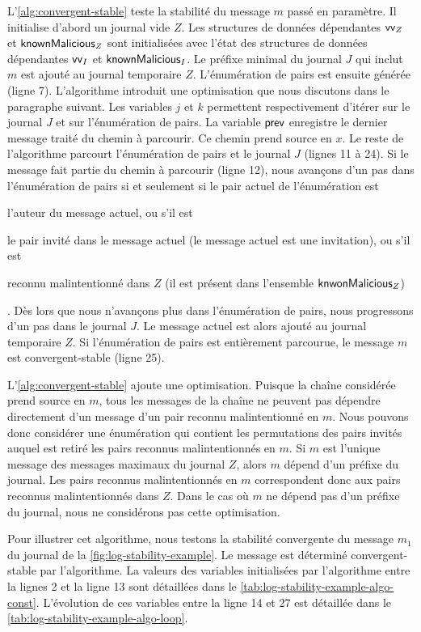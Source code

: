 L'\autoref{alg:convergent-stable} teste la stabilité du message $m$ passé en paramètre.
Il initialise d'abord un journal vide $Z$.
Les structures de données dépendantes $\operatorname{\mathsf{vv}}_Z$ et $\operatorname{\mathsf{knownMalicious}}_Z$ sont initialisées avec l'état des structures de données dépendantes $\operatorname{\mathsf{vv}}_I$ et $\operatorname{\mathsf{knownMalicious}}_I$.
Le préfixe minimal du journal $J$ qui inclut $m$ est ajouté au journal temporaire $Z$.
L'énumération de pairs est ensuite générée (ligne 7).
L'algorithme introduit une optimisation que nous discutons dans le paragraphe suivant.
Les variables $j$ et $k$ permettent respectivement d'itérer sur le journal $J$ et sur l'énumération de pairs.
La variable $\operatorname{\mathsf{prev}}$ enregistre le dernier message traité du chemin à parcourir.
Ce chemin prend source en $x$.
Le reste de l'algorithme parcourt l'énumération de pairs et le journal $J$ (lignes 11 à 24).
Si le message fait partie du chemin à parcourir (ligne 12), nous avançons d'un pas dans l'énumération de pairs si et seulement si le pair actuel de l'énumération est \begin{inlinelist}\item l'auteur du message actuel, ou s'il est \item le pair invité dans le message actuel (le message actuel est une invitation), ou s'il est \item reconnu malintentionné dans $Z$ (il est présent dans l'ensemble $\operatorname{\mathsf{knwonMalicious}}_Z$) \end{inlinelist}.
Dès lors que nous n'avançons plus dans l'énumération de pairs, nous progressons d'un pas dans le journal $J$.
Le message actuel est alors ajouté au journal temporaire $Z$.
Si l'énumération de pairs est entièrement parcourue, le message $m$ est convergent-stable (ligne 25).

L'\autoref{alg:convergent-stable} ajoute une optimisation.
Puisque la chaîne considérée prend source en $m$, tous les messages de la chaîne ne peuvent pas dépendre directement d'un message d'un pair reconnu malintentionné en $m$.
Nous pouvons donc considérer une énumération qui contient les permutations des pairs invités auquel est retiré les pairs reconnus malintentionnés en $m$.
Si $m$ est l'unique message des messages maximaux du journal $Z$, alors $m$ dépend d'un préfixe du journal.
Les pairs reconnus malintentionnés en $m$ correspondent donc aux pairs reconnus malintentionnés dans $Z$.
Dans le cas où $m$ ne dépend pas d'un préfixe du journal, nous ne considérons pas cette optimisation.

Pour illustrer cet algorithme, nous testons la stabilité convergente du message $m_1$ du journal de la \autoref{fig:log-stability-example}.
Le message est déterminé convergent-stable par l'algorithme.
La valeurs des variables initialisées par l'algorithme entre la lignes 2 et la ligne 13 sont détaillées dans le \autoref{tab:log-stability-example-algo-const}.
L'évolution de ces variables entre la ligne 14 et 27 est détaillée dans le \autoref{tab:log-stability-example-algo-loop}.

